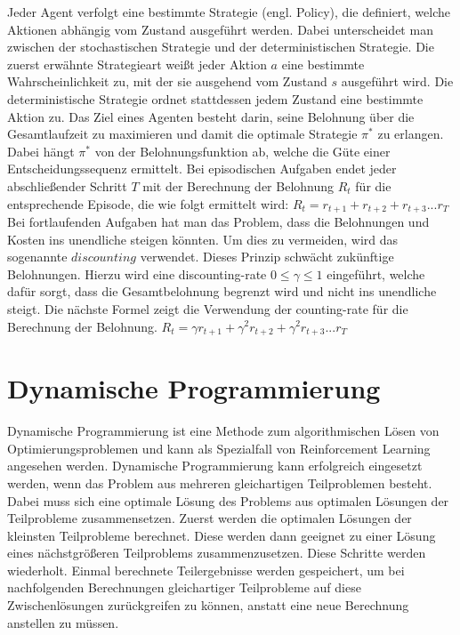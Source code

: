 \documentclass[10pt]{scrartcl}
\begin{document}
Jeder Agent verfolgt eine bestimmte Strategie (engl. Policy), die definiert, welche Aktionen abhängig vom Zustand ausgeführt werden. Dabei unterscheidet man zwischen der stochastischen Strategie und der deterministischen Strategie. Die zuerst erwähnte Strategieart weißt jeder Aktion $a$ eine bestimmte Wahrscheinlichkeit zu, mit der sie ausgehend vom Zustand $s$ ausgeführt wird. Die deterministische Strategie ordnet stattdessen jedem Zustand eine bestimmte Aktion zu. Das Ziel eines Agenten besteht darin, seine Belohnung über die Gesamtlaufzeit zu maximieren und damit die optimale Strategie {$\pi^*$} zu erlangen.
Dabei hängt $\pi^*$ von der Belohnungsfunktion ab, welche die Güte einer Entscheidungssequenz ermittelt. 
Bei episodischen Aufgaben endet jeder abschließender Schritt $T$ mit der Berechnung der Belohnung $R_t$ für die entsprechende Episode, die wie folgt ermittelt wird:
$R_t = r_{t+1} + r_{t+2} + r_{t+3} ... r_T$  
Bei fortlaufenden Aufgaben hat man das Problem, dass die Belohnungen und Kosten ins unendliche steigen könnten. Um dies zu vermeiden, wird das sogenannte $discounting$ verwendet. Dieses Prinzip schwächt zukünftige Belohnungen. Hierzu wird eine discounting-rate $0\le \gamma \le1$ eingeführt, welche dafür sorgt, dass die Gesamtbelohnung begrenzt wird und nicht ins unendliche steigt. Die nächste Formel zeigt die Verwendung der counting-rate für die Berechnung der Belohnung.
$R_t = \gamma r_{t+1} + \gamma^2 r_{t+2} + \gamma^2 r_{t+3} ... r_T$


\section{Dynamische Programmierung}

Dynamische Programmierung ist eine Methode zum algorithmischen Lösen von Optimierungsproblemen und kann als Spezialfall von Reinforcement Learning angesehen werden. Dynamische Programmierung kann erfolgreich eingesetzt werden, wenn das Problem aus mehreren gleichartigen Teilproblemen besteht. Dabei muss sich eine optimale Lösung des Problems aus optimalen Lösungen der Teilprobleme zusammensetzen. Zuerst werden die optimalen Lösungen der kleinsten Teilprobleme berechnet. Diese werden dann geeignet zu einer Lösung eines nächstgrößeren Teilproblems zusammenzusetzen. Diese Schritte werden wiederholt. Einmal berechnete Teilergebnisse werden gespeichert, um bei nachfolgenden Berechnungen gleichartiger Teilprobleme auf diese Zwischenlösungen zurückgreifen zu können, anstatt eine neue Berechnung anstellen zu müssen. 
\end{document}
